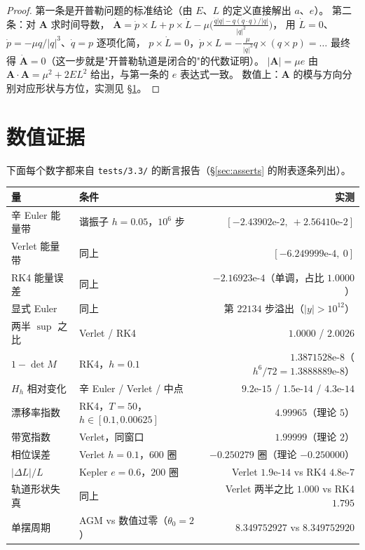 \begin{proof}
第一条是开普勒问题的标准结论（由 $E$、$L$ 的定义直接解出 $a$、$e$）。
第二条：对 $\mathbf A$ 求时间导数，
$\dot{\mathbf A}=\dot p\times L+p\times\dot L-\mu\bigl(\tfrac{\dot q|q|-q(\dot q\cdot q)/|q|}{|q|^2}\bigr)$，
用 $\dot L=0$、$\dot p=-\mu q/|q|^3$、$\dot q=p$ 逐项化简，
$p\times\dot L=0$，$\dot p\times L=-\tfrac{\mu}{|q|^3}q\times(q\times p)=\ldots$
最终得 $\dot{\mathbf A}=0$（这一步就是"开普勒轨道是闭合的"的代数证明）。
$|\mathbf A|=\mu e$ 由 $\mathbf A\cdot\mathbf A=\mu^2+2EL^2$ 给出，与第一条的 $e$ 表达式一致。
数值上：$\mathbf A$ 的模与方向分别对应形状与方位，实测见 \S\ref{sec:evidence}。
\end{proof}

\section{数值证据}
\label{sec:evidence}

下面每个数字都来自 \texttt{tests/3.3/} 的断言报告（\S\ref{sec:asserts} 的附表逐条列出）。

\begin{center}
\begin{tabular}{llr}
\toprule
量 & 条件 & 实测 \\
\midrule
辛 Euler 能量带 & 谐振子 $h=0.05$，$10^6$ 步 & $[-2.43902\text{e-}2,\ +2.56410\text{e-}2]$ \\
Verlet 能量带 & 同上 & $[-6.249999\text{e-}4,\ 0]$ \\
RK4 能量误差 & 同上 & $-2.16923\text{e-}4$（单调，占比 $1.0000$）\\
显式 Euler & 同上 & 第 $22134$ 步溢出（$|y|>10^{12}$）\\
两半 $\sup$ 之比 & Verlet / RK4 & $1.0000$ / $2.0026$ \\
$1-\det M$ & RK4，$h=0.1$ & $1.3871528\text{e-}8$（$h^6/72=1.3888889\text{e-}8$）\\
$H_h$ 相对变化 & 辛 Euler / Verlet / 中点 & $9.2\text{e-}15$ / $1.5\text{e-}14$ / $4.3\text{e-}14$ \\
漂移率指数 & RK4，$T=50$，$h\in[0.1,0.00625]$ & $4.99965$（理论 $5$）\\
带宽指数 & Verlet，同窗口 & $1.99999$（理论 $2$）\\
相位误差 & Verlet $h=0.1$，$600$ 圈 & $-0.250279$ 圈（理论 $-0.250000$）\\
$|\Delta L|/L$ & Kepler $e=0.6$，$200$ 圈 & Verlet $1.9\text{e-}14$ vs RK4 $4.8\text{e-}7$ \\
轨道形状失真 & 同上 & Verlet 两半之比 $1.000$ vs RK4 $1.795$ \\
单摆周期 & AGM vs 数值过零（$\theta_0=2$） & $8.349752927$ vs $8.349752920$ \\
\bottomrule
\end{tabular}
\end{center}

